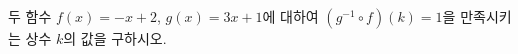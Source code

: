 \hspace*{2mm}\begin{minipage}[t]{\dimexpr\linewidth-2mm\relax}\vspace{0pt}
두 함수 $f(x)=-x+2$, $g(x)=3x+1$에 대하여 $(g^{-1}\circ f)(k)=1$을 만족시키는 상수 $k$의 값을 구하시오.\end{minipage}
